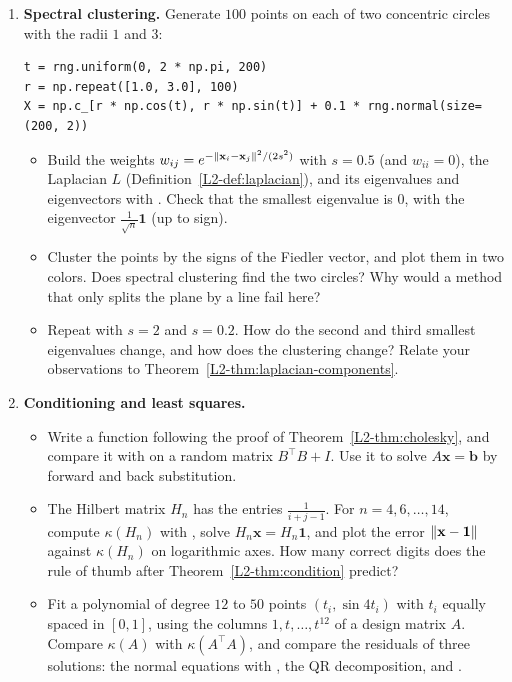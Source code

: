 \begin{enumerate}[label=\textbf{P\arabic*.}, leftmargin=*]
    \item \textbf{Spectral clustering.} Generate $100$ points on each of two concentric circles with the radii $1$ and $3$:
\begin{lstlisting}
t = rng.uniform(0, 2 * np.pi, 200)
r = np.repeat([1.0, 3.0], 100)
X = np.c_[r * np.cos(t), r * np.sin(t)] + 0.1 * rng.normal(size=(200, 2))
\end{lstlisting}
    \begin{itemize}
        \item Build the weights $w_{ij} = e^{-\lVert \mathbf{x}_i - \mathbf{x}_j \rVert^2/(2s^2)}$ with $s = 0.5$ (and $w_{ii} = 0$), the Laplacian $L$ (Definition~\ref{L2-def:laplacian}), and its eigenvalues and eigenvectors with . Check that the smallest eigenvalue is $0$, with the eigenvector $\frac{1}{\sqrt{n}}\mathbf{1}$ (up to sign).
        \item Cluster the points by the signs of the Fiedler vector, and plot them in two colors. Does spectral clustering find the two circles? Why would a method that only splits the plane by a line fail here?
        \item Repeat with $s = 2$ and $s = 0.2$. How do the second and third smallest eigenvalues change, and how does the clustering change? Relate your observations to Theorem~\ref{L2-thm:laplacian-components}.
    \end{itemize}

    \item \textbf{Conditioning and least squares.}
    \begin{itemize}
        \item Write a function  following the proof of Theorem~\ref{L2-thm:cholesky}, and compare it with  on a random matrix $B^\top B + I$. Use it to solve $A\mathbf{x} = \mathbf{b}$ by forward and back substitution.
        \item The Hilbert matrix $H_n$ has the entries $\frac{1}{i + j - 1}$. For $n = 4, 6, \ldots, 14$, compute $\kappa(H_n)$ with , solve $H_n\mathbf{x} = H_n\mathbf{1}$, and plot the error $\lVert \mathbf{x} - \mathbf{1} \rVert$ against $\kappa(H_n)$ on logarithmic axes. How many correct digits does the rule of thumb after Theorem~\ref{L2-thm:condition} predict?
        \item Fit a polynomial of degree $12$ to $50$ points $(t_i, \sin 4t_i)$ with $t_i$ equally spaced in $[0, 1]$, using the columns $1, t, \ldots, t^{12}$ of a design matrix $A$. Compare $\kappa(A)$ with $\kappa(A^\top A)$, and compare the residuals of three solutions: the normal equations with , the QR decomposition, and .
    \end{itemize}
\end{enumerate}
\endgroup
